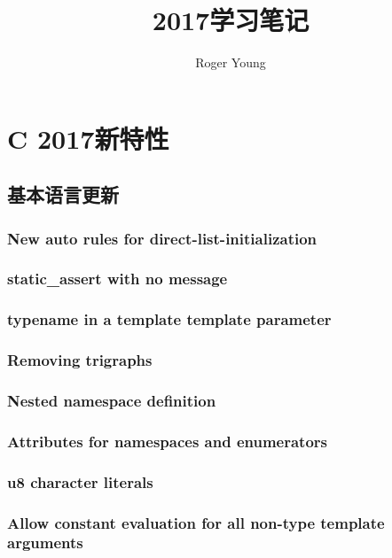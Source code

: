 \documentclass{book}
\author{Roger Young}
\title{\Cpp 2017学习笔记}
\newcommand{\Rplus}{\protect\hspace{-.1em}\protect\raisebox{.35ex}{\smaller{\smaller\textbf{+}}}}
\newcommand{\Cpp}{\mbox{C\Rplus\Rplus}\xspace}
\begin{document}
	\maketitle
	\tableofcontents
	
\chapter{\Cpp 2017新特性}

\section{基本语言更新}

\subsection{New auto rules for direct-list-initialization}

\subsection{static\_assert with no message}

\subsection{typename in a template template parameter}

\subsection{Removing trigraphs}

\subsection{Nested namespace definition}

\subsection{Attributes for namespaces and enumerators}

\subsection{u8 character literals}

\subsection{Allow constant evaluation for all non-type template arguments}
\end{document}
